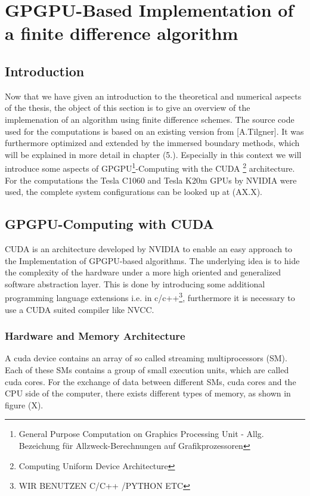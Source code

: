 \chapter{GPGPU-Based Implementation of a finite difference algorithm}

\section{Introduction}

Now that we have given an introduction to the theoretical and numerical aspects of the thesis,
the object of this section is to give an overview of the implemenation of an algorithm using finite difference schemes.
The source code used for the computations is based on an existing version from [A.Tilgner].
It was furthermore optimized  and extended by the immersed boundary methods, which will be explained in more detail in chapter (5.).
Especially in this context we will introduce some aspects of GPGPU\footnote{General Purpose Computation on Graphics Processing Unit - Allg.  Bezeichung für Allzweck-Berechnungen auf Grafikprozessoren}-Computing
with the CUDA \footnote{Computing Uniform Device Architecture} architecture.
For the computations the  Tesla C1060 and Tesla K20m GPUs by NVIDIA were used, the complete system configurations can be looked up at (AX.X).

\section{GPGPU-Computing with CUDA}

CUDA is an architecture developed by NVIDIA to enable an easy approach to the Implementation of GPGPU-based algorithms.
The underlying idea is to hide the complexity of the hardware under a more high oriented and generalized software abstraction layer.
This is done by introducing some additional programming language extensions i.e. in c/c++\footnote{WIR BENUTZEN C/C++ /PYTHON ETC},
furthermore it is necessary to use a CUDA suited compiler like NVCC.

\subsection{Hardware and Memory Architecture}

A cuda device contains an array of so called streaming multiprocessors (SM).
Each of these SMs contains a group of small execution units, which are called cuda cores.
For the exchange of data between different SMs, cuda cores and the CPU side of the computer, there exists different
types of memory, as shown  in figure (X).

